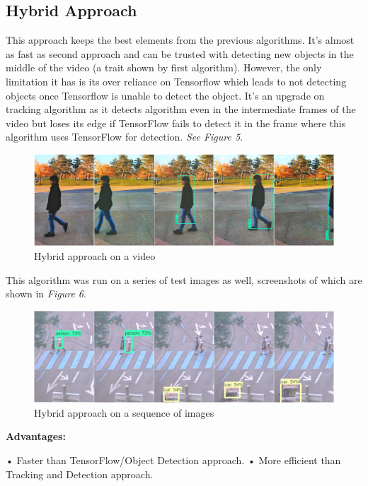 \documentclass[10pt,twocolumn,letterpaper]{article}
\begin{document}
\subsection{Hybrid Approach}  

This approach keeps the best elements from the previous algorithms. It’s almost as fast as second approach and can be trusted with detecting new objects in the middle of the video (a trait shown by first algorithm). However, the only limitation it has is its over reliance on Tensorflow which leads to not detecting objects once Tensorflow is unable to detect the object. It’s an upgrade on tracking algorithm as it detects algorithm even in the intermediate frames of the video but loses its edge if TensorFlow fails to detect it in the frame where this algorithm uses TensorFlow for detection. \textit{See Figure 5}.

\begin{figure}
\includegraphics[width=\linewidth]{Hybrid.jpg}
\caption{Hybrid approach on a video}
\end{figure}

This algorithm was run on a series of test images as well, screenshots of which are shown in \textit{Figure 6}.

\begin{figure}
\includegraphics[width=\linewidth]{Hybrid_images.jpg}
\caption{Hybrid approach on a sequence of images}
\end{figure}

\textbf{Advantages:}

•	Faster than TensorFlow/Object Detection approach.
•	More efficient than Tracking and Detection approach.
\end{document}

